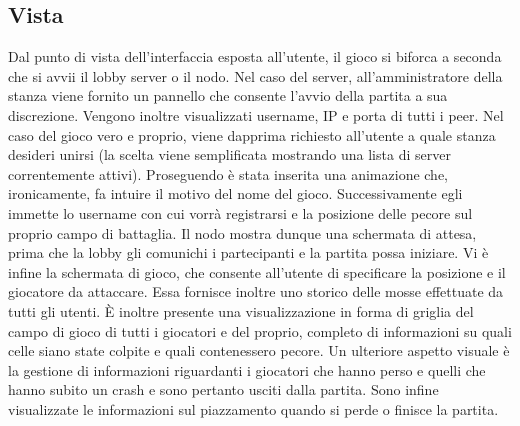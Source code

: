 \subsection{Vista}


Dal punto di vista dell'interfaccia esposta all’utente, il gioco si biforca a seconda che
si avvii il lobby server o il nodo. Nel caso del server, all’amministratore della stanza
viene fornito un pannello che consente l’avvio della partita a sua discrezione. Vengono
inoltre visualizzati username, IP e porta di tutti i peer.
Nel caso del gioco vero e proprio, viene dapprima richiesto all’utente a quale stanza
desideri unirsi (la scelta viene semplificata mostrando una lista di server correntemente attivi).
Proseguendo è stata inserita una animazione che, ironicamente, fa intuire il motivo del nome del gioco.
Successivamente egli immette lo username con cui vorrà registrarsi e la posizione delle pecore sul
proprio campo di battaglia. Il nodo mostra dunque una schermata di attesa, prima
che la lobby gli comunichi i partecipanti e la partita possa iniziare.
Vi è infine la schermata di gioco, che consente all’utente di specificare la posizione e
il giocatore da attaccare. Essa fornisce inoltre uno storico delle mosse effettuate da
tutti gli utenti. È inoltre presente una visualizzazione in forma di griglia del campo
di gioco di tutti i giocatori e del proprio, completo di informazioni su quali celle siano
state colpite e quali contenessero pecore. Un ulteriore aspetto visuale è la gestione
di informazioni riguardanti i giocatori che hanno perso e quelli che hanno subito un
crash e sono pertanto usciti dalla partita. Sono infine visualizzate le informazioni sul
piazzamento quando si perde o finisce la partita.
